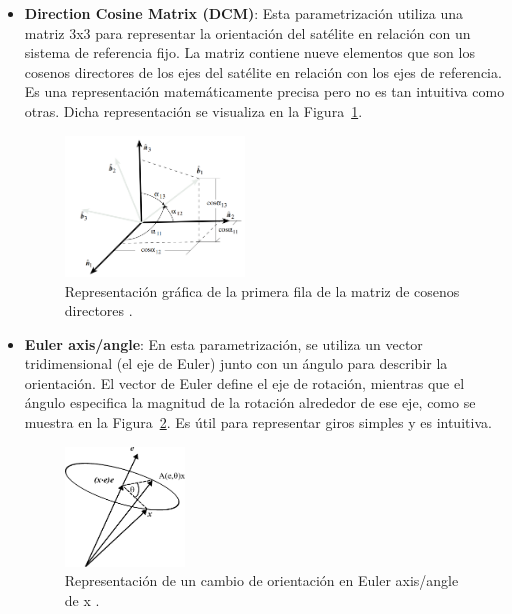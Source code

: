 \begin{itemize}
	\item \textbf{Direction Cosine Matrix (DCM)}: Esta parametrización utiliza una matriz 3x3 para representar la orientación del satélite en relación con un sistema de referencia fijo. La matriz contiene nueve elementos que son los cosenos directores de los ejes del satélite en relación con los ejes de referencia. Es una representación matemáticamente precisa pero no es tan intuitiva como otras. Dicha representación se visualiza en la Figura~\ref{fig:DCM}.
	
	\begin{figure}[H]
		\centering    
		\includegraphics[width=0.45\textwidth]{DCM.png}
		\caption{Representación gráfica de la primera fila de la matriz de cosenos directores \cite{ref27}.}
		\label{fig:DCM}
	\end{figure}
	
	\item \textbf{Euler axis/angle}: En esta parametrización, se utiliza un vector tridimensional (el eje de Euler) junto con un ángulo para describir la orientación. El vector de Euler define el eje de rotación, mientras que el ángulo especifica la magnitud de la rotación alrededor de ese eje, como se muestra en la Figura~\ref{fig:axis_angle}. Es útil para representar giros simples y es intuitiva. 
	
	\begin{figure}[H]
		\centering    
		\includegraphics[width=0.3\textwidth]{axis_angle.pdf}
		\caption{Representación de un cambio de orientación en Euler axis/angle de x \cite{ref25}.}
		\label{fig:axis_angle}
	\end{figure}	
	

\end{itemize}

